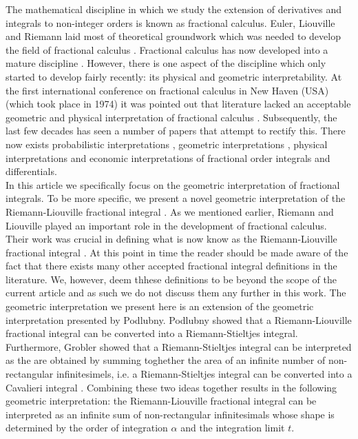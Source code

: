\documentclass{article}
\theoremstyle{theorem}
\theoremstyle{definition}
\begin{document}
\noindent
The mathematical discipline in which we study the extension of derivatives and integrals to non-integer orders is known as fractional calculus. Euler, Liouville and Riemann laid most 
of theoretical groundwork which was needed to develop the field of fractional calculus \cite{davis59,liouville1832,riemann1876,laurent1884}. Fractional calculus has now developed into a mature discipline \cite{machado14}. 
However, there is one aspect of the discipline which only started to develop fairly recently: its physical and geometric interpretability. At the first international conference on fractional calculus in
New Haven (USA) (which took place in 1974) it was pointed out that literature lacked an acceptable geometric and physical interpretation of fractional calculus \cite{ross06}. Subsequently, the last few decades has seen 
a number of papers that attempt to rectify this. There now exists probabilistic interpretations \cite{stanislavsky04,machado03}, geometric interpretations \cite{adda97,tarasov16,podlubny02}, physical interpretations \cite{cioc16,rutman95} and economic 
interpretations \cite{tarasova17} of fractional order integrals and differentials.\\

\noindent
In this article we specifically focus on the geometric interpretation of fractional integrals. To be more specific, we present a novel geometric interpretation of the Riemann-Liouville fractional integral \cite{laurent1884}.
As we mentioned earlier, Riemann and Liouville played an important role in the development of fractional calculus. Their work was crucial in defining what is now know as 
the Riemann-Liouville fractional integral \cite{laurent1884}. At this point in time the reader should be made aware of the fact that there exists many other accepted fractional integral definitions in the literature.
We, however, deem thhese definitions to be beyond the scope of the current article and as such we do not discuss them any further in this work. The geometric interpretation 
we present here is an extension of the geometric interpretation presented by Podlubny\cite{podlubny02}. Podlubny showed that a Riemann-Liouville fractional integral 
can be converted into a Riemann-Stieltjes integral. Furthermore, Grobler showed that a Riemann-Stieltjes integral can be interpreted as the are obtained by summing toghether 
the area of an infinite number of non-rectangular infinitesimels, i.e. a Riemann-Stieltjes integral can be converted into a Cavalieri integral \cite{ackermann12,?}. Combining these two ideas together results in the following geometric 
interpretation: the Riemann-Liouville fractional integral can be interpreted as an infinite sum of non-rectangular infinitesimals whose shape is determined by the order of integration $\alpha$ and the integration limit $t$.\\
\end{document}
